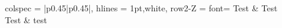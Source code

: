 \documentclass{article}
\begin{document}
\begin{tblr}{
    colspec = {|p{0.45\textwidth}|p{0.45\textwidth}|},
    hlines = {1pt,white},
    row{2-Z} = {font=\Large}
  }
  Test & Test \\
  Test & test
\end{tblr}


\end{document}
